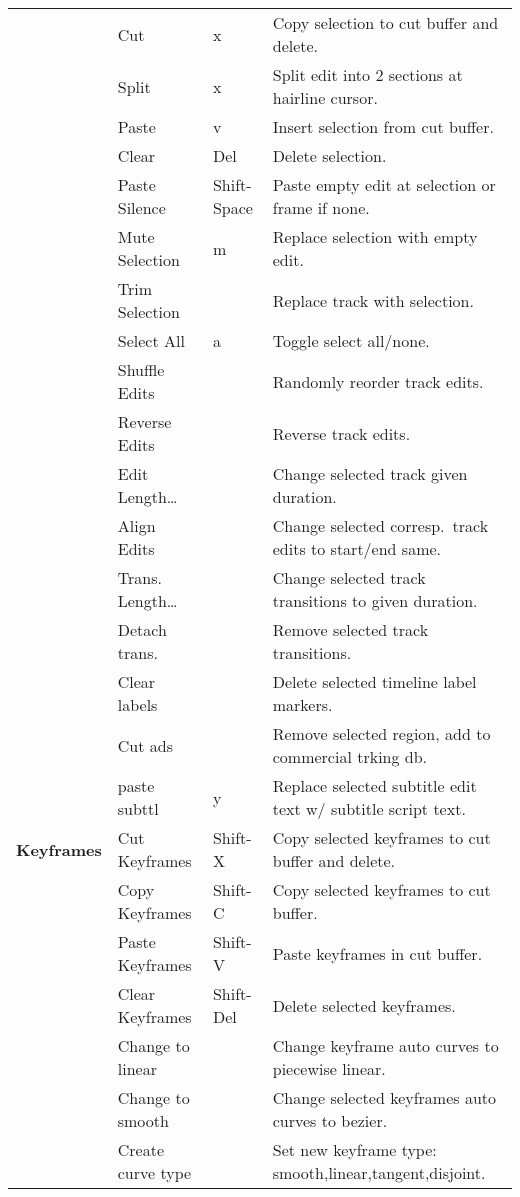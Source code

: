 \begin{longtable}[h]{>{\bfseries}p{}p{}p{}p{}}
  & Cut & x & Copy selection to cut buffer and delete. \\
  & Split & x & Split edit into 2 sections at hairline cursor. \\
  & Paste & v & Insert selection from cut buffer. \\
  & Clear & Del & Delete selection. \\
  & Paste Silence & Shift-Space & Paste empty edit at selection or frame if none. \\
  & Mute Selection & m & Replace selection with empty edit. \\
  & Trim Selection &  & Replace track with selection. \\
  & Select All & a & Toggle select all/none. \\
  & Shuffle Edits &  & Randomly reorder track edits. \\
  & Reverse Edits &  & Reverse track edits. \\
  & Edit Length\dots &  & Change selected track given duration. \\
  & Align Edits &  & Change selected corresp.\ track edits to start/end same. \\
  & Trans. Length\dots &  & Change selected track transitions to given duration. \\
  & Detach trans. &  & Remove selected track transitions. \\
  & Clear labels &  & Delete selected timeline label markers. \\
  & Cut ads &  & Remove selected region, add to commercial trking db. \\
  & paste subttl & y & Replace selected subtitle edit text w/ subtitle script text. \\
  \midrule
  \textcolor{CinBlueText}{Keyframes} & Cut Keyframes & Shift-X & Copy selected keyframes to cut buffer and delete. \\
  & Copy Keyframes & Shift-C & Copy selected keyframes to cut buffer. \\
  & Paste Keyframes & Shift-V & Paste keyframes in cut buffer. \\
  & Clear Keyframes & Shift-Del & Delete selected keyframes. \\
  & Change to linear &  & Change keyframe auto curves to piecewise linear. \\
  & Change to smooth &  & Change selected keyframes auto curves to bezier. \\
  & Create curve type &  & Set new keyframe type: smooth,linear,tangent,disjoint. \\

\end{longtable}
